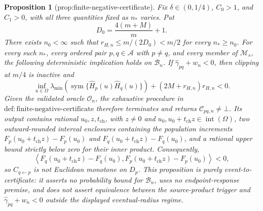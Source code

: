 \documentclass{article}
\newtheorem{proposition}{Proposition}
\begin{document}
\begin{proposition}[prop:finite-negative-certificate]\label{prop:finite-negative-certificate}
Fix \(\delta\in(0,1/4)\), \(C_0>1\), and \(C_1>0\), with all three quantities fixed as \(n_\ast\) varies.  Put
\[
 D_0=\frac{4(m+M)}{m}+1.
\]
There exists \(n_0<\infty\) such that \(r_{H,n}\le m/(2D_0)<m/2\) for every \(n_\ast\ge n_0\).  For every such \(n_\ast\), every ordered pair \(p,q\in\mathcal A\) with \(p\ne q\), and every member of \(\mathcal M_s\), the following deterministic implication holds on \(\mathcal B_n\).  If \(\widehat\gamma_{pq}+w_n<0\), then clipping at \(m/4\) is inactive and
\[
 \inf_{u\in\Omega}\lambda_{\min}\!\left(
 \operatorname{sym}\{\widehat H_p(u)\widehat H_q(u)\}\right)
 +(2M+r_{H,n})r_{H,n}<0.
\]
Given the validated oracle \(\mathcal O_n\), the exhaustive procedure in \(\mathrm{def:finite\text{-}negative\text{-}certificate}\) therefore terminates and returns \(\mathcal C_{pq,n}\ne\bot\).  Its output contains rational \(u_0,z,t_{\mathrm{ch}}\), with \(z\ne0\) and \(u_0,u_0+t_{\mathrm{ch}}z\in\operatorname{int}(\Omega)\), two outward-rounded interval enclosures containing the population increments \(F_p(u_0+t_{\mathrm{ch}}z)-F_p(u_0)\) and \(F_q(u_0+t_{\mathrm{ch}}z)-F_q(u_0)\), and a rational upper bound strictly below zero for their inner product.  Consequently,
\[
 \left\langle F_q(u_0+t_{\mathrm{ch}}z)-F_q(u_0),
 F_p(u_0+t_{\mathrm{ch}}z)-F_p(u_0)\right\rangle<0,
\]
so \(C_{q\leftarrow p}\) is not Euclidean monotone on \(D_p\).  This proposition is purely event-to-certificate: it asserts no probability bound for \(\mathcal B_n\), uses no endpoint-response premise, and does not assert equivalence between the source-product trigger and \(\widehat\gamma_{pq}+w_n<0\) outside the displayed eventual-radius regime.
\end{proposition}
\end{document}
